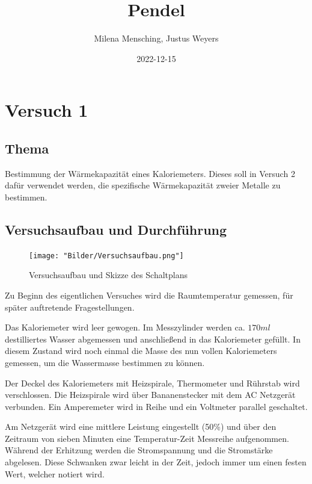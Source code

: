 \documentclass[
  9pt,
]{article}
\title{Pendel}
\author{Milena Mensching, Justus Weyers}
\date{2022-12-15}
\begin{document}
\maketitle

\hypertarget{versuch-1}{%
\section{Versuch 1}\label{versuch-1}}

\hypertarget{thema}{%
\subsection{Thema}\label{thema}}

Bestimmung der Wärmekapazität eines Kaloriemeters. Dieses soll in
Versuch 2 dafür verwendet werden, die spezifische Wärmekapazität zweier
Metalle zu bestimmen.

\hypertarget{versuchsaufbau-und-durchfuxfchrung}{%
\subsection{Versuchsaufbau und
Durchführung}\label{versuchsaufbau-und-durchfuxfchrung}}

\begin{figure}
\centering
\texttt{[image: "Bilder/Versuchsaufbau.png"]}
\caption{Versuchsaufbau und Skizze des Schaltplans}
\end{figure}

Zu Beginn des eigentlichen Versuches wird die Raumtemperatur gemessen,
für später auftretende Fragestellungen.

Das Kaloriemeter wird leer gewogen. Im Messzylinder werden ca. \(170ml\)
destilliertes Wasser abgemessen und anschließend in das Kaloriemeter
gefüllt. In diesem Zustand wird noch einmal die Masse des nun vollen
Kaloriemeters gemessen, um die Wassermasse bestimmen zu können.

Der Deckel des Kaloriemeters mit Heizspirale, Thermometer und Rührstab
wird verschlossen. Die Heizspirale wird über Bananenstecker mit dem AC
Netzgerät verbunden. Ein Amperemeter wird in Reihe und ein Voltmeter
parallel geschaltet.

Am Netzgerät wird eine mittlere Leistung eingestellt (50\%) und über den
Zeitraum von sieben Minuten eine Temperatur-Zeit Messreihe aufgenommen.
Während der Erhitzung werden die Stromspannung und die Stromstärke
abgelesen. Diese Schwanken zwar leicht in der Zeit, jedoch immer um
einen festen Wert, welcher notiert wird.
\end{document}

